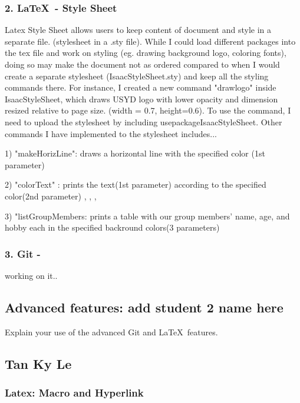 \documentclass[a4paper, 11pt]{report}
\begin{document}
\subsubsection{2. \LaTeX\ - Style Sheet}
Latex Style Sheet allows users to keep content of document and style in a separate file. (stylesheet in a .sty file). While I could load different packages into the tex file and work on styling (eg. drawing background logo, coloring fonts), doing so may make the document not as ordered compared to when I would create a separate stylesheet (IsaacStyleSheet.sty) and keep all the styling commands there. For instance, I created a new command "drawlogo" inside IsaacStyleSheet, which draws USYD logo with lower opacity and dimension resized relative to page size. (width = 0.7, height=0.6). To use the command, I need to upload the stylesheet by including usepackage{IsaacStyleSheet}. Other commands I have implemented to the stylesheet includes... 

1) "makeHorizLine": draws a horizontal line with the specified color (1st parameter)

2) "colorText" : prints the text(1st parameter) according to the specified color(2nd parameter)
, , , 

3) "listGroupMembers: prints a table with our group members' name, age, and hobby each in the specified backround colors(3  parameters)

\subsubsection{3. Git - }
working on it..



\subsection{Advanced features: add student 2 name here}

Explain your use of the advanced Git and \LaTeX\ features. 

\subsection{Tan Ky Le}

\subsubsection{ Latex: Macro and Hyperlink}
\newcommand{\BoldandItalic}[0]{\textbf{\textit{ \underline{macro}}}}
\end{document}
